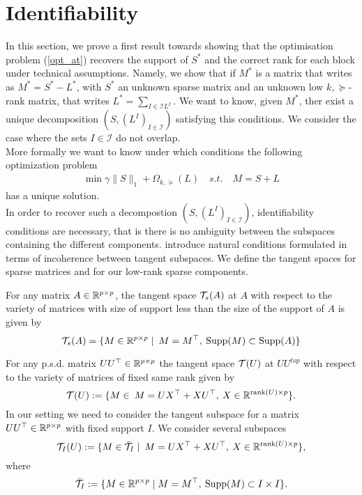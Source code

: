 \section{Identifiability}
\label{sec:id}

In this section, we prove a first result towards showing that the optimisation problem (\ref{opt_at}) recovers the support of $S^*$ and the correct rank for each block under technical assumptions. Namely, we show that if  $M^{\ast}$ is a matrix that writes as  $M^{\ast}= S^{\ast}-L^{\ast}$, with $S^{\ast}$ an unknown sparse matrix and an unknown  low $k,\succeq$-rank matrix, that writes  $L^{\ast}=\sum_{I\in\mathcal{I}L^{I}}$. We want to know, given $M^{\ast}$, ther exist a unique decomposition $\left(S,(L^{I})_{I\in\mathcal{I}}\right)$ satisfying this conditions. We consider the case where the sets $I\in\mathcal{I}$ do not overlap.  \\

More formally we want to know under which conditions the following optimization problem 
\begin{align}
\min \gamma\|S\|_1+\Omega_{k,\succeq}(L) \quad s.t. \quad M=S+L
\end{align}
has a unique solution.\\

In order to recover such a decompostion  $\left(S,(L^{I})_{I\in\mathcal{I}}\right)$, identifiability conditions are necessary, that is there is no ambiguity between the subspaces containing the different components.  \citet{chandrasekaran2011rank} introduce natural conditions formulated in terms of incoherence between tangent subspaces. We define the tangent spaces for sparse matrices and for our low-rank sparse components.

For any matrix $A\in\mathbb{R}^{p\times p}$, the tangent space $\mathcal{T}_s(A)$ at $A$ with respect to the variety of matrices with size of support less than the size of the support of $A$ is given by
$$
\mathcal{T}_s(A)=\{M \in \mathbb{R}^{p \times p}\mid  \: M=M^\top, \: {\rm Supp}(M)\subset {\rm Supp}(A)\}
$$

For any p.s.d. matrix $UU^{\top}\in\mathbb{R}^{p\times p}$  the tangent space $\mathcal{T}(U)$ at $UU^{top}$ with respect to the variety of matrices of fixed same rank given by
$$
\mathcal{T}(U):=\{M \in \: M=UX^\top+XU^\top,\: X \in \mathbb{R}^{\text{rank}(U) \times p} \}.
$$
In our setting we need to consider the tangent subspace for a matrix $UU^{\top}\in\mathbb{R}^{p\times p}$ with fixed support $I$.
We consider several subspaces
$$\mathcal{T}_I(U):=\{M \in \bar{\mathcal{T}}_I\mid \: M=UX^\top+XU^\top,\: X \in \mathbb{R}^{\text{rank}(U) \times p} \},$$
where 
$$
\bar{\mathcal{T}}_I:=\{M \in \mathbb{R}^{p \times p}\mid  M=M^\top, \: {\rm Supp}(M)\subset I \times I\}.
$$

